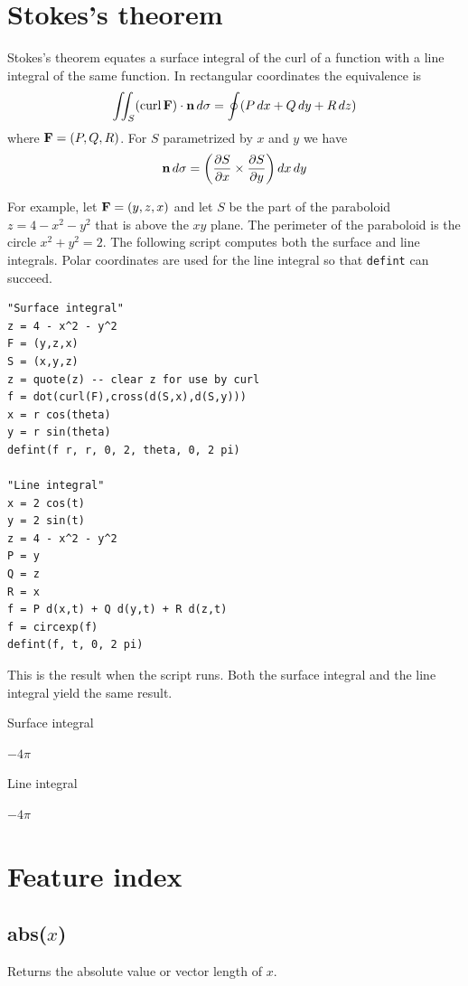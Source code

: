 \documentclass[12pt]{article}
\begin{document}
\newpage

\section{Stokes's theorem}

Stokes's theorem equates a surface integral of the curl of a function
with a line integral of the same function.
In rectangular coordinates the equivalence is
%
$$
\iint_S(\mathop{\rm curl}{\bf F})\cdot{\bf n}\,d\sigma
=\oint (P\,dx+Q\,dy+R\,dz)
$$
%
where ${\bf F}=(P,Q,R)$.
For $S$ parametrized by $x$ and $y$ we have
$${\bf n}\,d\sigma=\left(
\frac{\partial S}{\partial x}\times\frac{\partial S}{\partial y}
\right)dx\,dy$$

For example,
let ${\bf F}=(y,z,x)$ and let $S$ be the part of the paraboloid
$z=4-x^2-y^2$
that is above the $xy$ plane.
The perimeter of the paraboloid is the circle $x^2+y^2=2$.
The following script computes both the surface and line integrals.
Polar coordinates are used for the line integral so that \verb$defint$ can succeed.

{\color{blue}
\begin{verbatim}
"Surface integral"
z = 4 - x^2 - y^2
F = (y,z,x)
S = (x,y,z)
z = quote(z) -- clear z for use by curl
f = dot(curl(F),cross(d(S,x),d(S,y)))
x = r cos(theta)
y = r sin(theta)
defint(f r, r, 0, 2, theta, 0, 2 pi)

"Line integral"
x = 2 cos(t)
y = 2 sin(t)
z = 4 - x^2 - y^2
P = y
Q = z
R = x
f = P d(x,t) + Q d(y,t) + R d(z,t)
f = circexp(f)
defint(f, t, 0, 2 pi)
\end{verbatim}
}

This is the result when the script runs.
Both the surface integral and the line integral
yield the same result.

\bigskip
Surface integral

$\displaystyle -4\pi$

Line integral

$\displaystyle -4\pi$

\newpage

\section{Feature index}

\subsection*{abs($x$)}

Returns the absolute value or vector length of $x$.
\end{document}
